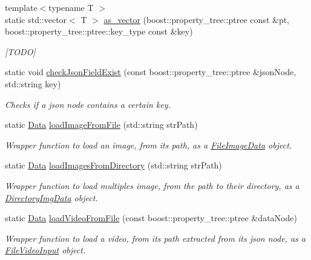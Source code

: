 \begin{DoxyCompactItemize}
\item 
{\footnotesize template$<$typename T $>$ }\\static std\+::vector$<$ T $>$ \hyperlink{classfilter_1_1data_1_1_composer_a18a6b0b2a11dad44847df3eefad292a1}{as\+\_\+vector} (boost\+::property\+\_\+tree\+::ptree const \&pt, boost\+::property\+\_\+tree\+::ptree\+::key\+\_\+type const \&key)
\begin{DoxyCompactList}\small\item\em \mbox{[}T\+O\+DO\mbox{]} \end{DoxyCompactList}\item 
static void \hyperlink{classfilter_1_1data_1_1_composer_a559095987098ff3e3997c6c093a3bff0}{check\+Json\+Field\+Exist} (const boost\+::property\+\_\+tree\+::ptree \&json\+Node, std\+::string key)
\begin{DoxyCompactList}\small\item\em Checks if a json node contains a certain key. \end{DoxyCompactList}\item 
static \hyperlink{classfilter_1_1data_1_1_data}{Data} \hyperlink{classfilter_1_1data_1_1_composer_a77e70226b7d20b2d13995e37833ec88c}{load\+Image\+From\+File} (std\+::string str\+Path)
\begin{DoxyCompactList}\small\item\em Wrapper function to load an image, from its path, as a \hyperlink{classfilter_1_1data_1_1_file_image_data}{File\+Image\+Data} object. \end{DoxyCompactList}\item 
static \hyperlink{classfilter_1_1data_1_1_data}{Data} \hyperlink{classfilter_1_1data_1_1_composer_a4bbcdee91dffc1737fb71bb702ea521f}{load\+Images\+From\+Directory} (std\+::string str\+Path)
\begin{DoxyCompactList}\small\item\em Wrapper function to load multiples image, from the path to their directory, as a \hyperlink{classfilter_1_1data_1_1_directory_img_data}{Directory\+Img\+Data} object. \end{DoxyCompactList}\item 
static \hyperlink{classfilter_1_1data_1_1_data}{Data} \hyperlink{classfilter_1_1data_1_1_composer_a8f642146a9e50f97ba68afcfcdf9eb7b}{load\+Video\+From\+File} (const boost\+::property\+\_\+tree\+::ptree \&data\+Node)
\begin{DoxyCompactList}\small\item\em Wrapper function to load a video, from its path extracted from its json node, as a \hyperlink{classfilter_1_1data_1_1_file_video_input}{File\+Video\+Input} object. \end{DoxyCompactList}\item 

\end{DoxyCompactItemize}
